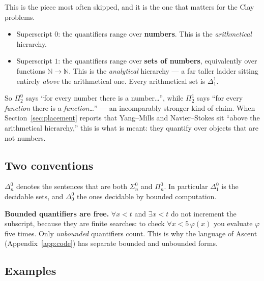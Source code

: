 \documentclass[11pt,a4paper]{article}
\newcommand{\Sig}[2]{\Sigma^{#1}_{#2}}
\newcommand{\Pai}[2]{\Pi^{#1}_{#2}}
\newcommand{\Del}[2]{\Delta^{#1}_{#2}}
\begin{document}
This is the piece most often skipped, and it is the one that matters for the
Clay problems.

\begin{itemize}
\item Superscript $0$: the quantifiers range over \textbf{numbers}. This is
the \emph{arithmetical} hierarchy.
\item Superscript $1$: the quantifiers range over \textbf{sets of numbers},
equivalently over functions $\mathbb{N} \to \mathbb{N}$. This is the
\emph{analytical} hierarchy --- a far taller ladder sitting entirely
\emph{above} the arithmetical one. Every arithmetical set is $\Del{1}{1}$.
\end{itemize}

So $\Pai{0}{2}$ says ``for every number there is a number\ldots'', while
$\Pai{1}{2}$ says ``for every \emph{function} there is a \emph{function}\ldots''
--- an incomparably stronger kind of claim. When
Section~\ref{sec:placement} reports that Yang--Mills and Navier--Stokes sit
``above the arithmetical hierarchy,'' this is what is meant: they quantify
over objects that are not numbers.

\subsection*{Two conventions}

$\Del{0}{n}$ denotes the sentences that are both $\Sig{0}{n}$ and
$\Pai{0}{n}$. In particular $\Del{0}{1}$ is the decidable sets, and
$\Del{0}{0}$ the ones decidable by bounded computation.

\textbf{Bounded quantifiers are free.} $\forall x < t$ and $\exists x < t$ do
not increment the subscript, because they are finite searches: to check
$\forall x < 5\, \varphi(x)$ you evaluate $\varphi$ five times. Only
\emph{unbounded} quantifiers count. This is why the language of Ascent
(Appendix~\ref{app:code}) has separate bounded and unbounded forms.

\subsection*{Examples}
\end{document}
